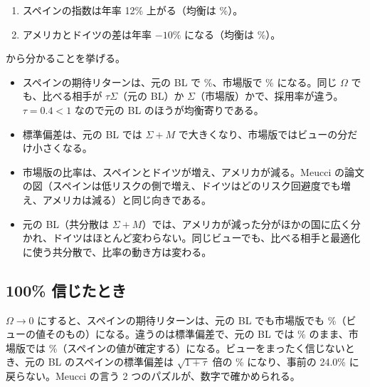 \begin{enumerate}
\item スペインの指数は年率 12\% 上がる（均衡は \%）。
\item アメリカとドイツの差は年率 $-10\%$ になる（均衡は \%）。
\end{enumerate}

\begin{table}[htbp]
\centering
\caption{Meucci の 6 か国の例（年率 \%）。$\mu_{\mathrm{BL}}$、$\sigma_{\mathrm{BL}}$ は元の BL（$\tau=0.4$、共分散は $\Sigma+M$）、$\mu_{\mathrm{mBL}}$、$\sigma_{\mathrm{mBL}}$ は市場版。$w^*$ は空売りなし・全額投資で $w\T\mu-\lambda w\T\Sigma w$（$\lambda=1.2$）を最大にした比率。}
\label{tab:meucci}
\end{table}

 から分かることを挙げる。

\begin{itemize}
\item スペインの期待リターンは、元の BL で \%、市場版で \% になる。同じ $\Omega$ でも、比べる相手が $\tau\Sigma$（元の BL）か $\Sigma$（市場版）かで、採用率が違う。$\tau=0.4<1$ なので元の BL のほうが均衡寄りである。
\item 標準偏差は、元の BL では $\Sigma+M$ で大きくなり、市場版ではビューの分だけ小さくなる。
\item 市場版の比率は、スペインとドイツが増え、アメリカが減る。Meucci の論文の図（スペインは低リスクの側で増え、ドイツはどのリスク回避度でも増え、アメリカは減る）と同じ向きである。
\item 元の BL（共分散は $\Sigma+M$）では、アメリカが減った分がほかの国に広く分かれ、ドイツはほとんど変わらない。同じビューでも、比べる相手と最適化に使う共分散で、比率の動き方は変わる。
\end{itemize}

\subsection*{100\% 信じたとき}

$\Omega\to0$ にすると、スペインの期待リターンは、元の BL でも市場版でも \%（ビューの値そのもの）になる。違うのは標準偏差で、元の BL では \% のまま、市場版では \%（スペインの値が確定する）になる。ビューをまったく信じないとき、元の BL のスペインの標準偏差は $\sqrt{1+\tau}$ 倍の \% になり、事前の 24.0\% に戻らない。Meucci の言う 2 つのパズルが、数字で確かめられる。

